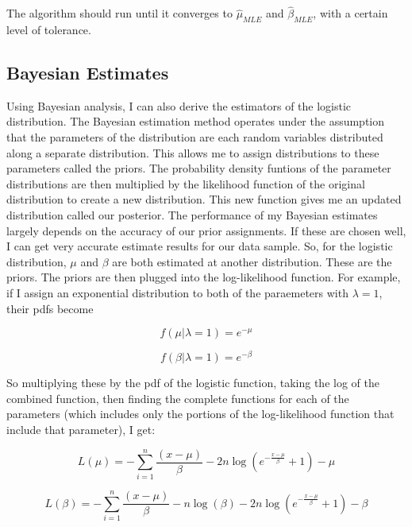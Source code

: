 \documentclass{svproc}
\begin{document}
The algorithm should run until it converges to $\hat{\mu}_{MLE}$ and $\hat{\beta}_{MLE}$, with a certain level of tolerance. 

\subsection{Bayesian Estimates}

Using Bayesian analysis, I can also derive the estimators of the logistic distribution. The Bayesian estimation method operates under the assumption that the parameters of the distribution are each random variables distributed along a separate distribution. This allows me to assign distributions to these parameters called the priors. The probability density funtions of the parameter distributions are then multiplied by the likelihood function of the original distribution to create a new distribution. This new function gives me an updated distribution called our posterior. The performance of my Bayesian estimates largely depends on the accuracy of our prior assignments. If these are chosen well, I can get very accurate estimate results for our data sample. So, for the logistic distribution, $\mu$ and $\beta$ are both estimated at another distribution. These are the priors. The priors are then plugged into the log-likelihood function. For example, if I assign an exponential distribution to both of the paraemeters with $\lambda=1$, their pdfs become

\begin{equation}
f(\mu| \lambda=1) = e^{-\mu}
\label{4.1}
\end{equation}

\begin{equation}
f(\beta| \lambda=1) = e^{-\beta}
\label{4.2}
\end{equation}

\bigskip

So multiplying these by the pdf of the logistic function, taking the log of the combined function, then finding the complete functions for each of the parameters (which includes only the portions of the log-likelihood function that include that parameter), I get:

\begin{equation}
L(\mu) = -\sum_{i=1}^{n} \frac{(x-\mu)}{\beta} - 2 n \log(e^{-\frac{x-\mu}{\beta }} + 1) - \mu
\label{3.1}
\end{equation}

\begin{equation}
L(\beta) = -\sum_{i=1}^{n} \frac{(x-\mu)}{\beta} - n \log(\beta) - 2 n \log(e^{-\frac{x-\mu}{\beta }} + 1) - \beta
\label{3.2}
\end{equation}
\end{document}
